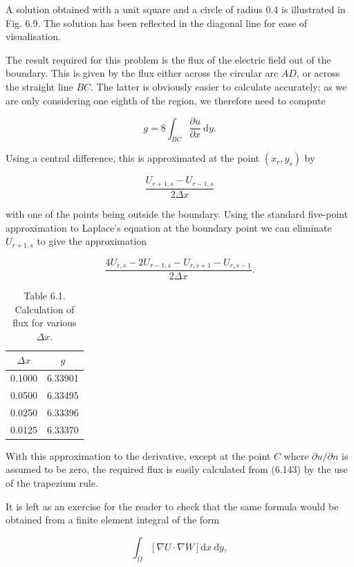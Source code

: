 \documentclass[10pt]{article}
\begin{document}
A solution obtained with a unit square and a circle of radius 0.4 is illustrated in Fig. 6.9. The solution has been reflected in the diagonal line for ease of visualisation.

The result required for this problem is the flux of the electric field out of the boundary. This is given by the flux either across the circular arc \(A D\), or across the straight line \(B C\). The latter is obviously easier to calculate accurately; as we are only considering one eighth of the region, we therefore need to compute

\[
g=8 \int_{B C} \frac{\partial u}{\partial x} \mathrm{~d} y .
\]

Using a central difference, this is approximated at the point \(\left(x_{r}, y_{s}\right)\) by

\[
\frac{U_{r+1, s}-U_{r-1, s}}{2 \Delta x}
\]

with one of the points being outside the boundary. Using the standard five-point approximation to Laplace's equation at the boundary point we can eliminate \(U_{r+1, s}\) to give the approximation

\[
\frac{4 U_{r, s}-2 U_{r-1, s}-U_{r, s+1}-U_{r, s-1}}{2 \Delta x} .
\]

\begin{table}[h]
\begin{center}
\captionsetup{labelformat=empty}
\caption{Table 6.1. Calculation of flux for various \(\Delta x\).}
\begin{tabular}{cc}
\hline\hline
\(\Delta x\) & \(g\) \\
\hline
0.1000 & 6.33901 \\
0.0500 & 6.33495 \\
0.0250 & 6.33396 \\
0.0125 & 6.33370 \\
\hline\hline
\end{tabular}
\end{center}
\end{table}

With this approximation to the derivative, except at the point \(C\) where \(\partial u / \partial n\) is assumed to be zero, the required flux is easily calculated from (6.143) by the use of the trapezium rule.

It is left as an exercise for the reader to check that the same formula would be obtained from a finite element integral of the form

\[
\int_{\Omega}[\nabla U \cdot \nabla W] \mathrm{d} x \mathrm{~d} y,
\]
\end{document}
